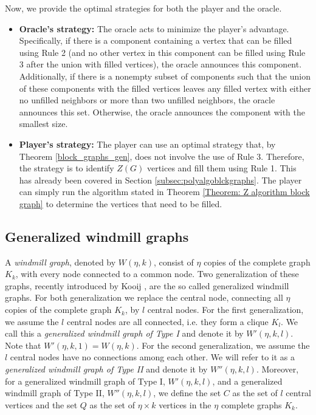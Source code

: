 \documentclass[11pt]{article}
\theoremstyle{plain}
\theoremstyle{definition}
\theoremstyle{remark}
\begin{document}
Now, we provide the optimal strategies for both the player and the oracle.
\begin{itemize}
    \item \textbf{Oracle's strategy:} The oracle acts to minimize the player's advantage. Specifically, if there is a component containing a vertex that can be filled using Rule 2 (and no other vertex in this component can be filled using Rule 3 after the union with filled vertices), the oracle announces this component. Additionally, if there is a nonempty subset of components such that the union of these components with the filled vertices leaves any filled vertex with either no unfilled neighbors or more than two unfilled neighbors, the oracle announces this set. Otherwise, the oracle announces the component with the smallest size.

    \item \textbf{Player's strategy:} The player can use an optimal strategy that, by Theorem \ref{block_graphs_gen}, does not involve the use of Rule 3. Therefore, the strategy is to identify $Z(G)$ vertices and fill them using Rule 1. This has already been covered in Section \ref{subsec:polyalgoblckgraphs}. The player can simply run the algorithm stated in Theorem \ref{Theorem: Z algorithm block graph} to determine the vertices that need to be filled.
\end{itemize}


\subsection{Generalized windmill graphs}

A \emph{windmill graph}, denoted by $W(\eta, k)$, consist of $\eta$ copies of the complete graph $K_k$, with every node connected to a common node. Two generalization of these graphs, recently introduced by Kooij \cite{kooij2019generalized}, are the so called generalized windmill graphs. For both generalization we replace the central node, connecting all $\eta$ copies of the complete graph $K_k$, by $l$ central nodes. For the first generalization, we assume the $l$ central nodes are all connected, i.e. they form a clique $K_l$. We
call this a \emph{generalized windmill graph of Type I} and denote it by $W'(\eta,k,l)$. Note that $W'(\eta,k,1)=W(\eta,k)$. For the second generalization, we assume the $l$ central nodes have no connections among each other. We will refer to it as a \emph{generalized windmill graph of Type II} and denote it by $W''(\eta,k,l)$. Moreover, for a generalized windmill graph of Type I, $ W'(\eta, k, l) $, and a generalized windmill graph of Type II, $ W''(\eta, k, l) $, we define the set $ C $ as the set of $ l $ central vertices and the set $ Q $ as the set of $ \eta \times k $ vertices in the $ \eta $ complete graphs $ K_k $.
\end{document}
